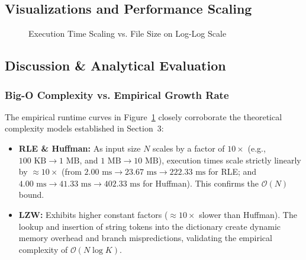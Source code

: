 \documentclass{article}
\begin{document}
\subsection{Visualizations and Performance Scaling}
\begin{figure}[H]
\centering
{}
\caption{Execution Time Scaling vs. File Size on Log-Log Scale}
\label{fig:time_scaling}
\end{figure}

\subsection{Discussion \& Analytical Evaluation}

\subsubsection{Big-O Complexity vs. Empirical Growth Rate}
The empirical runtime curves in Figure~\ref{fig:time_scaling} closely corroborate the theoretical complexity models established in Section~3:
\begin{itemize}
    \item \textbf{RLE \& Huffman:} As input size $N$ scales by a factor of $10\times$ (e.g., $100\text{ KB} \to 1\text{ MB}$, and $1\text{ MB} \to 10\text{ MB}$), execution times scale strictly linearly by $\approx 10\times$ (from $2.00\text{ ms} \to 23.67\text{ ms} \to 222.33\text{ ms}$ for RLE; and $4.00\text{ ms} \to 41.33\text{ ms} \to 402.33\text{ ms}$ for Huffman). This confirms the $\mathcal{O}(N)$ bound.
    \item \textbf{LZW:} Exhibits higher constant factors ($\approx 10\times$ slower than Huffman). The lookup and insertion of string tokens into the dictionary create dynamic memory overhead and branch mispredictions, validating the empirical complexity of $\mathcal{O}(N \log K)$.
\end{itemize}
\end{document}
